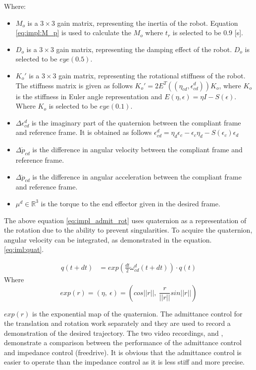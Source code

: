 Where:
\begin{itemize}
    \item $M_o$ is a $3\times3$ gain matrix, representing the inertia  of the robot. Equation \ref{eq:impl:M_p} is used to calculate the $M_o$ where $t_r$ is selected to be $0.9$ [s].
    \item $D_o$ is a $3\times3$ gain matrix, representing the damping effect of the robot. $D_o$ is selected to be $eye(0.5)$.
    \item $K_o'$ is a $3\times3$ gain matrix, representing the rotational stiffness of the robot. The stiffness matrix is given as follows $K_o' = 2E^T((\eta_{cd}, \epsilon_{cd}^d)) K_o$, where $K_o$ is the stiffness in Euler angle representation and $E(\eta , \epsilon) = \eta I - S(\epsilon)$. Where $K_o$ is selected to be $eye(0.1)$.

    \item $\Delta{\epsilon}_{cd}^d$ is the imaginary part of the quaternion between the  compliant frame and reference frame. It is obtained as follows ${\epsilon}_{cd}^d = \eta_d \epsilon_c - \epsilon_c \eta_d -S(\epsilon_c) \epsilon_d$
    
    \item $\Delta\dot{p}_{cd}$ is the difference in angular velocity between the compliant frame and reference frame.
    \item $\Delta\ddot{p}_{cd}$ is the difference in angular acceleration between the compliant frame and reference frame.
    \item $\mu^d\in\mathds{R}^3$ is the torque to the end effector given in the desired frame.
\end{itemize}

The above equation \ref{eq:impl_admit_rot} uses quaternion as a representation of the rotation due to the ability to prevent singularities. To acquire the quaternion, angular velocity can be integrated, as demonstrated in the equation. \ref{eq:iml:quat}.

\begin{align}
q(t+dt) &= exp\left( \frac{dt}{2}\omega_{cd}^d(t+dt) \right) \cdot q(t)
\label{eq:iml:quat}
\end{align}
Where
$$exp(r) = (\eta,~\epsilon) = \left(cos ||r||,~\frac{r}{||r||}sin||r||\right)$$

$exp(r)$ is the exponential map of the quaternion. 
The admittance control for the translation and rotation work separately and they are used to record a demonstration of the desired trajectory. 
The two video recordings, \cite{github-FreeDrive} and \cite{github-Admittance}, demonstrate a comparison between the performance of the admittance control and impedance control (freedrive). It is obvious that the admittance control is easier to operate than the impedance control as it is less stiff and more precise.

